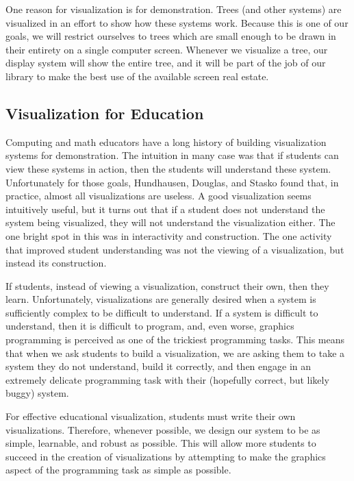 \documentclass{article}
\begin{document}
One reason for visualization is for demonstration.  Trees (and other systems)
are visualized in an effort to show how these systems work.  Because this is
one of our goals, we will restrict ourselves to trees which are small enough to
be drawn in their entirety on a single computer screen.  Whenever we visualize a tree, our display system will show the entire tree, and it will be part of the job of our library to make the best use of the available screen real estate.

\subsection{Visualization for Education}
\label{educ}

Computing and math educators have a long history of building visualization
systems for demonstration.  The intuition in many case was that if students can view these
systems in action, then the students will understand these system.
Unfortunately for those goals, Hundhausen, Douglas, and Stasko found that, in practice, almost all
visualizations are useless\cite{hds}.  A good visualization seems intuitively useful, but
it turns out that if a student does not understand the system being visualized, they will not understand the visualization either.  The one bright spot in this was in interactivity and construction.  The one activity that improved student understanding was not the viewing of a visualization, but instead its construction.

If students, instead of viewing a visualization, construct their own, then they
learn.  Unfortunately, visualizations are generally desired when a system is
sufficiently complex to be difficult to understand.  If a system is difficult
to understand, then it is difficult to program, and, even worse, graphics
programming is perceived as one of the trickiest programming tasks.  This means
that when we ask students to build a visualization, we are asking them to take
a system they do not understand, build it correctly, and then engage in an
extremely delicate programming task with their (hopefully correct, but likely
buggy) system.

For effective educational visualization, students must write their own
visualizations.  Therefore, whenever possible, we design our system to be as
simple, learnable, and robust as possible.  This will allow more students to
succeed in the creation of visualizations by attempting to make the graphics
aspect of the programming task as simple as possible.
\end{document}
